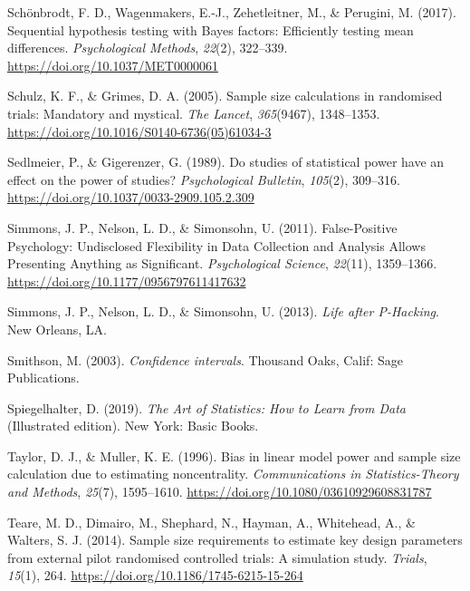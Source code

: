 \documentclass[
  english,
  ,jou, a4paper,floatsintext]{apa6}
\newlength{\cslhangindent}
\newenvironment{cslreferences}%
  {\setlength{\parindent}{0pt}%
  \everypar{\setlength{\hangindent}{\cslhangindent}}\ignorespaces}%
  {\par}
\begin{document}
\begin{cslreferences}
\leavevmode\hypertarget{ref-schonbrodt_sequential_2017}{}%
Schönbrodt, F. D., Wagenmakers, E.-J., Zehetleitner, M., \& Perugini, M. (2017). Sequential hypothesis testing with Bayes factors: Efficiently testing mean differences. \emph{Psychological Methods}, \emph{22}(2), 322--339. \url{https://doi.org/10.1037/MET0000061}

\leavevmode\hypertarget{ref-schulz_sample_2005}{}%
Schulz, K. F., \& Grimes, D. A. (2005). Sample size calculations in randomised trials: Mandatory and mystical. \emph{The Lancet}, \emph{365}(9467), 1348--1353. \url{https://doi.org/10.1016/S0140-6736(05)61034-3}

\leavevmode\hypertarget{ref-sedlmeier_studies_1989}{}%
Sedlmeier, P., \& Gigerenzer, G. (1989). Do studies of statistical power have an effect on the power of studies? \emph{Psychological Bulletin}, \emph{105}(2), 309--316. \url{https://doi.org/10.1037/0033-2909.105.2.309}

\leavevmode\hypertarget{ref-simmons_false-positive_2011}{}%
Simmons, J. P., Nelson, L. D., \& Simonsohn, U. (2011). False-Positive Psychology: Undisclosed Flexibility in Data Collection and Analysis Allows Presenting Anything as Significant. \emph{Psychological Science}, \emph{22}(11), 1359--1366. \url{https://doi.org/10.1177/0956797611417632}

\leavevmode\hypertarget{ref-simmons_life_2013}{}%
Simmons, J. P., Nelson, L. D., \& Simonsohn, U. (2013). \emph{Life after P-Hacking}. New Orleans, LA.

\leavevmode\hypertarget{ref-smithson_confidence_2003}{}%
Smithson, M. (2003). \emph{Confidence intervals}. Thousand Oaks, Calif: Sage Publications.

\leavevmode\hypertarget{ref-spiegelhalter_art_2019}{}%
Spiegelhalter, D. (2019). \emph{The Art of Statistics: How to Learn from Data} (Illustrated edition). New York: Basic Books.

\leavevmode\hypertarget{ref-taylor_bias_1996}{}%
Taylor, D. J., \& Muller, K. E. (1996). Bias in linear model power and sample size calculation due to estimating noncentrality. \emph{Communications in Statistics-Theory and Methods}, \emph{25}(7), 1595--1610. \url{https://doi.org/10.1080/03610929608831787}

\leavevmode\hypertarget{ref-teare_sample_2014}{}%
Teare, M. D., Dimairo, M., Shephard, N., Hayman, A., Whitehead, A., \& Walters, S. J. (2014). Sample size requirements to estimate key design parameters from external pilot randomised controlled trials: A simulation study. \emph{Trials}, \emph{15}(1), 264. \url{https://doi.org/10.1186/1745-6215-15-264}


\end{cslreferences}
\end{document}
